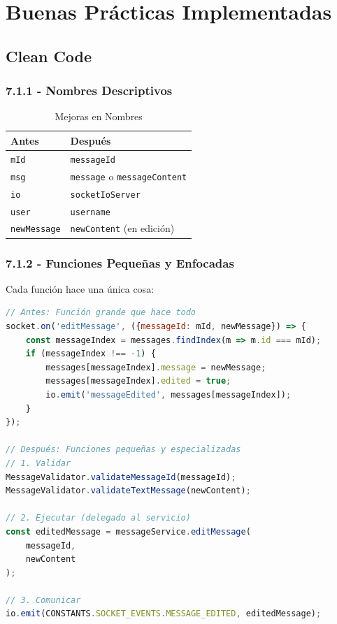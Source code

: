 \documentclass[12pt,a4paper]{article}
\begin{document}
\newpage

\section{Buenas Prácticas Implementadas}

\subsection{Clean Code}

\subsubsection{7.1.1 - Nombres Descriptivos}
\begin{table}[h]
\centering
\caption{Mejoras en Nombres}
\begin{tabular}{|l|l|}
\hline
\textbf{Antes} & \textbf{Después} \\
\hline
\texttt{mId} & \texttt{messageId} \\
\texttt{msg} & \texttt{message} o \texttt{messageContent} \\
\texttt{io} & \texttt{socketIoServer} \\
\texttt{user} & \texttt{username} \\
\texttt{newMessage} & \texttt{newContent} (en edición) \\
\hline
\end{tabular}
\end{table}

\subsubsection{7.1.2 - Funciones Pequeñas y Enfocadas}
Cada función hace una única cosa:

\begin{lstlisting}[language=JavaScript]
// Antes: Función grande que hace todo
socket.on('editMessage', ({messageId: mId, newMessage}) => {
    const messageIndex = messages.findIndex(m => m.id === mId);
    if (messageIndex !== -1) {
        messages[messageIndex].message = newMessage;
        messages[messageIndex].edited = true;
        io.emit('messageEdited', messages[messageIndex]);
    }
});

// Después: Funciones pequeñas y especializadas
// 1. Validar
MessageValidator.validateMessageId(messageId);
MessageValidator.validateTextMessage(newContent);

// 2. Ejecutar (delegado al servicio)
const editedMessage = messageService.editMessage(
    messageId, 
    newContent
);

// 3. Comunicar
io.emit(CONSTANTS.SOCKET_EVENTS.MESSAGE_EDITED, editedMessage);
\end{lstlisting}
\end{document}
